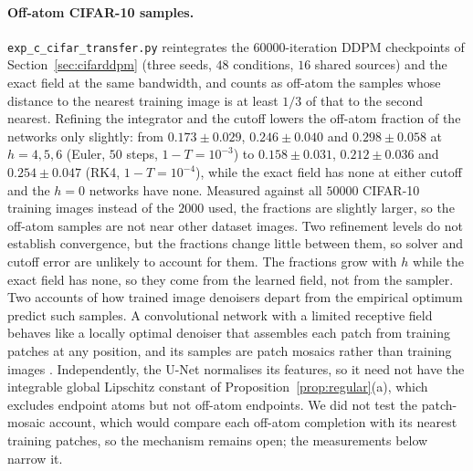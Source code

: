 \documentclass{article} %
\theoremstyle{plain}
\theoremstyle{definition}
\theoremstyle{remark}
\begin{document}
\paragraph{Off-atom CIFAR-10 samples.} \texttt{exp\_c\_cifar\_transfer.py} reintegrates the
$60000$-iteration DDPM checkpoints of Section~\ref{sec:cifarddpm} (three seeds, $48$ conditions,
$16$ shared sources) and the exact field at the same bandwidth, and counts as off-atom the samples
whose distance to the nearest training image is at least $1/3$ of that to the second nearest. Refining
the integrator and the cutoff lowers the off-atom fraction of the networks only slightly: from
$0.173\pm0.029$, $0.246\pm0.040$ and $0.298\pm0.058$ at $h=4,5,6$ (Euler, $50$ steps,
$1-T=10^{-3}$) to $0.158\pm0.031$, $0.212\pm0.036$ and $0.254\pm0.047$ (RK4, $1-T=10^{-4}$),
while the exact field has none at either cutoff and the $h=0$ networks have none. Measured
against all $50000$ CIFAR-10 training images instead of the $2000$ used, the fractions are
slightly larger, so the off-atom samples are not near other dataset images. Two refinement levels
do not establish convergence, but the fractions change little between them, so solver and cutoff
error are unlikely to account for them. The fractions grow with $h$ while the exact field has
none, so they come from the learned field, not from the sampler. Two accounts of how trained
image denoisers depart from the empirical optimum predict such samples. A convolutional network
with a limited receptive field behaves like a locally optimal denoiser that assembles each patch
from training patches at any position, and its samples are patch mosaics rather than training
images \citep{kamb2024creativity,niedoba2024mechanistic}. Independently, the U-Net normalises its
features, so it need not have the integrable global Lipschitz constant of
Proposition~\ref{prop:regular}(a), which excludes endpoint atoms but not off-atom endpoints. We
did not test the patch-mosaic account, which would compare each off-atom completion with its
nearest training patches, so the mechanism remains open; the measurements below narrow it.
\end{document}
